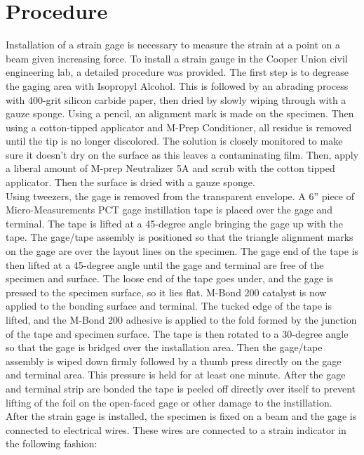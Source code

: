 \documentclass{article}
\begin{document}
    \section{Procedure}
    \indent Installation of a strain gage is necessary to measure the strain at a point on a beam given increasing force. To install a strain gauge in the Cooper Union civil engineering lab, a detailed procedure was provided. The first step is to degrease the gaging area with Isopropyl Alcohol. This is followed by an abrading process with 400-grit silicon carbide paper, then dried by slowly wiping through with a gauze sponge. Using a pencil, an alignment mark is made on the specimen. Then using a cotton-tipped applicator and M-Prep Conditioner, all residue is removed until the tip is no longer discolored. The solution is closely monitored to make sure it doesn’t dry on the surface as this leaves a contaminating film. Then, apply a liberal amount of M-prep Neutralizer 5A and scrub with the cotton tipped applicator. Then the surface is dried with a gauze sponge. \\
    \indent Using tweezers, the gage is removed from the transparent envelope. A 6” piece of Micro-Measurements PCT gage instillation tape is placed over the gage and terminal. The tape is lifted at a 45-degree angle bringing the gage up with the tape. The gage/tape assembly is positioned so that the triangle alignment marks on the gage are over the layout lines on the specimen. The gage end of the tape is then lifted at a 45-degree angle until the gage and terminal are free of the specimen and surface. The loose end of the tape goes under, and the gage is pressed to the specimen surface, so it lies flat. M-Bond 200 catalyst is now applied to the bonding surface and terminal. The tucked edge of the tape is lifted, and the M-Bond 200 adhesive is applied to the fold formed by the junction of the tape and specimen surface. The tape is then rotated to a 30-degree angle so that the gage is bridged over the installation area. Then the gage/tape assembly is wiped down firmly followed by a thumb press directly on the gage and terminal area. This pressure is held for at least one minute. After the gage and terminal strip are bonded the tape is peeled off directly over itself to prevent lifting of the foil on the open-faced gage or other damage to the instillation. \\
    \indent After the strain gage is installed, the specimen is fixed on a beam and the gage is connected to electrical wires. These wires are connected to a strain indicator in the following fashion:
\end{document}

